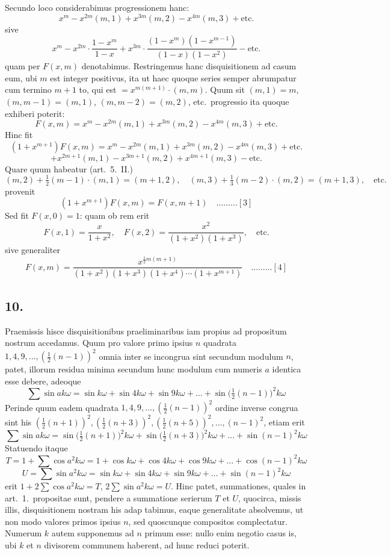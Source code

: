 \documentclass[12pt,a4paper]{article}
\theoremstyle{plain}
\begin{document}
Secundo loco considerabimus progressionem hanc:
\[
x^m - x^{2m}(m, 1) + x^{3m}(m, 2) - x^{4m}(m, 3) + \text{etc.}
\]
sive
\[
x^m - x^{2m} \cdot \frac{1-x^m}{1-x} + x^{3m} \cdot \frac{(1-x^m)(1-x^{m-1})}{(1-x)(1-x^2)} - \text{etc.}
\]
quam per $F(x, m)$ denotabimus. Restringemus hanc disquisitionem ad casum eum, ubi $m$ est integer positivus, ita ut haec quoque series semper abrumpatur cum termino $m+1$ to, qui est $= x^{m(m+1)} \cdot (m, m)$. Quum sit $(m, 1) = m$, $(m, m-1) = (m, 1)$, $(m, m-2) = (m, 2)$, etc.\ progressio ita quoque exhiberi poterit:
\[
F(x, m) = x^m - x^{2m}(m, 1) + x^{3m}(m, 2) - x^{4m}(m, 3) + \text{etc.}
\]
Hinc fit
\[
(1 + x^{m+1})F(x, m) = x^m - x^{2m}(m, 1) + x^{3m}(m, 2) - x^{4m}(m, 3) + \text{etc.}
\]
\[
+ x^{2m+1}(m, 1) - x^{3m+1}(m, 2) + x^{4m+1}(m, 3) - \text{etc.}
\]
Quare quum habeatur (art.\ 5.\ II.)
\[
(m, 2) + \tfrac{1}{2}(m-1) \cdot (m, 1) = (m+1, 2), \quad (m, 3) + \tfrac{1}{3}(m-2) \cdot (m, 2) = (m+1, 3), \quad \text{etc.}
\]
provenit
\[
(1 + x^{m+1})F(x, m) = F(x, m+1) \quad \ldots \ldots \ldots [3]
\]
Sed fit $F(x, 0) = 1$: quam ob rem erit
\[
F(x, 1) = \frac{x}{1+x^2}, \quad F(x, 2) = \frac{x^2}{(1+x^2)(1+x^3)}, \quad \text{etc.}
\]
sive generaliter
\[
F(x, m) = \frac{x^{\frac{1}{2}m(m+1)}}{(1+x^2)(1+x^3)(1+x^4) \cdots (1+x^{m+1})} \quad \ldots \ldots \ldots [4]
\]

\subsection*{10.}

Praemissis hisce disquisitionibus praeliminaribus iam propius ad propositum nostrum accedamus. Quum pro valore primo ipsius $n$ quadrata $1, 4, 9, \ldots, (\frac{1}{2}(n-1))^2$ omnia inter se incongrua sint secundum modulum $n$, patet, illorum residua minima secundum hunc modulum cum numeris $a$ identica esse debere, adeoque
\[
\sum \sin ak\omega = \sin k\omega + \sin 4k\omega + \sin 9k\omega + \ldots + \sin \bigl(\tfrac{1}{2}(n-1)\bigr)^2 k\omega
\]
Perinde quum eadem quadrata $1, 4, 9, \ldots, (\frac{1}{2}(n-1))^2$ ordine inverse congrua sint his $(\frac{1}{2}(n+1))^2, (\frac{1}{2}(n+3))^2, (\frac{1}{2}(n+5))^2, \ldots, (n-1)^2$, etiam erit
\[
\sum \sin ak\omega = \sin \bigl(\tfrac{1}{2}(n+1)\bigr)^2 k\omega + \sin \bigl(\tfrac{1}{2}(n+3)\bigr)^2 k\omega + \ldots + \sin (n-1)^2 k\omega
\]
Statuendo itaque
\[
T = 1 + \sum \cos a^2 k\omega = 1 + \cos k\omega + \cos 4k\omega + \cos 9k\omega + \ldots + \cos (n-1)^2 k\omega
\]
\[
U = \sum \sin a^2 k\omega = \sin k\omega + \sin 4k\omega + \sin 9k\omega + \ldots + \sin (n-1)^2 k\omega
\]
erit $1 + 2\sum \cos a^2 k\omega = T$, $2\sum \sin a^2 k\omega = U$. Hinc patet, summationes, quales in art.\ 1.\ propositae sunt, pendere a summatione serierum $T$ et $U$, quocirca, missis illis, disquisitionem nostram his adap tabimus, eaque generalitate absolvemus, ut non modo valores primos ipsius $n$, sed quoscunque compositos complectatur. Numerum $k$ autem supponemus ad $n$ primum esse: nullo enim negotio casus is, ubi $k$ et $n$ divisorem communem haberent, ad hunc reduci poterit.
\end{document}
